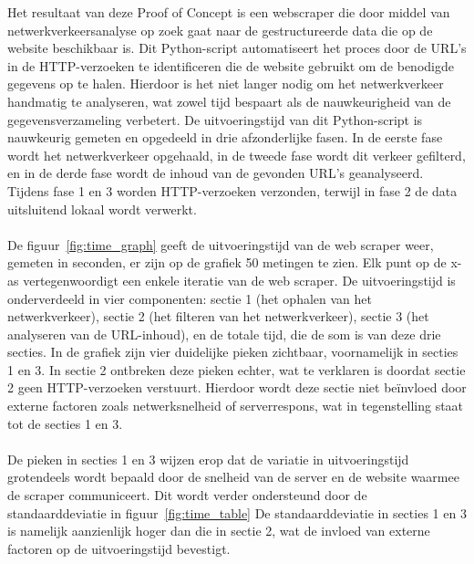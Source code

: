 Het resultaat van deze Proof of Concept is een webscraper die door middel van netwerkverkeersanalyse op zoek gaat naar de gestructureerde data die op de website beschikbaar is. Dit Python-script automatiseert het proces door de URL's in de HTTP-verzoeken te identificeren die de website gebruikt om de benodigde gegevens op te halen. Hierdoor is het niet langer nodig om het netwerkverkeer handmatig te analyseren, wat zowel tijd bespaart als de nauwkeurigheid van de gegevensverzameling verbetert.
De uitvoeringstijd van dit Python-script is nauwkeurig gemeten en opgedeeld in drie afzonderlijke fasen. In de eerste fase wordt het netwerkverkeer opgehaald, in de tweede fase wordt dit verkeer gefilterd, en in de derde fase wordt de inhoud van de gevonden URL's geanalyseerd. Tijdens fase 1 en 3 worden HTTP-verzoeken verzonden, terwijl in fase 2 de data uitsluitend lokaal wordt verwerkt.
\\ \\
De figuur~\ref{fig:time_graph} geeft de uitvoeringstijd van de web scraper weer, gemeten in seconden, er zijn op de grafiek 50 metingen te zien. Elk punt op de x-as vertegenwoordigt een enkele iteratie van de web scraper. De uitvoeringstijd is onderverdeeld in vier componenten: sectie 1 (het ophalen van het netwerkverkeer), sectie 2 (het filteren van het netwerkverkeer), sectie 3 (het analyseren van de URL-inhoud), en de totale tijd, die de som is van deze drie secties.
In de grafiek zijn vier duidelijke pieken zichtbaar, voornamelijk in secties 1 en 3. In sectie 2 ontbreken deze pieken echter, wat te verklaren is doordat sectie 2 geen HTTP-verzoeken verstuurt. Hierdoor wordt deze sectie niet beïnvloed door externe factoren zoals netwerksnelheid of serverrespons, wat in tegenstelling staat tot de secties 1 en 3.
\\ \\
De pieken in secties 1 en 3 wijzen erop dat de variatie in uitvoeringstijd grotendeels wordt bepaald door de snelheid van de server en de website waarmee de scraper communiceert. Dit wordt verder ondersteund door de standaarddeviatie in figuur~\ref{fig:time_table} De standaarddeviatie in secties 1 en 3 is namelijk aanzienlijk hoger dan die in sectie 2, wat de invloed van externe factoren op de uitvoeringstijd bevestigt.
